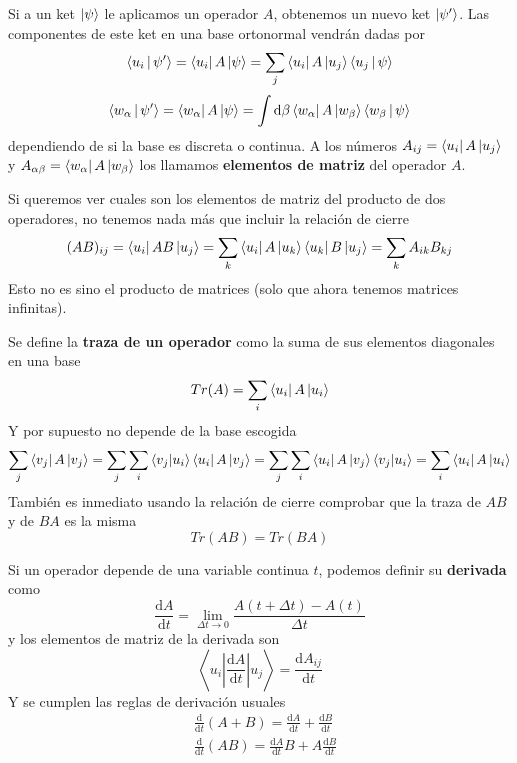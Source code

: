 \documentclass[12pt]{report}
\begin{document}
Si a un ket $\ket{\psi }$ le aplicamos un operador $A$, obtenemos un nuevo ket $\ket{\psi '}$. Las componentes de este ket en una base ortonormal vendrán dadas por
\begin{equation}
	\Braket{u_{i}|\psi '}=\bra{u_{i}}A\ket{\psi}=\sum_{j}\bra{u_{i}}A\ket{u_{j}}\Braket{u_{j}|\psi }
\end{equation}
\begin{equation}
	\Braket{w_{\alpha}|\psi '}=\bra{w_{\alpha}}A\ket{\psi}=\int\mathrm{d}\beta\bra{w_{\alpha}}A\ket{w_{\beta}}\Braket{w_{\beta}|\psi }
\end{equation}
dependiendo de si la base es discreta o continua. A los números $A_{ij}=\bra{u_{i}}A\ket{u_{j}}$ y $A_{\alpha\beta }=\bra{w_{\alpha }}A\ket{w_{\beta}}$ los llamamos \textbf{elementos de matriz} del operador $A$.

Si queremos ver cuales son los elementos de matriz del producto de dos operadores, no tenemos nada más que incluir la relación de cierre
\begin{equation}
	(AB)_{ij}=\bra{u_{i}}AB\ket{u_{j}}=\sum_{k}\bra{u_{i}}A\ket{u_{k}}\bra{u_{k}}B\ket{u_{j}}=\sum_{k}A_{ik}B_{kj}
\end{equation}
Esto no es sino el producto de matrices (solo que ahora tenemos matrices infinitas).

Se define la \textbf{traza de un operador} como la suma de sus elementos diagonales en una base
\begin{equation}
    Tr(A)=\sum_i\bra{u_i}A\ket{u_i}
\end{equation}
Y por supuesto no depende de la base escogida
\[ \sum_j\bra{v_j}A\ket{v_j}=\sum_j\sum_i\braket{v_j|u_i}\bra{u_i}A\ket{v_j}=\sum_j\sum_i\bra{u_i}A\ket{v_j}\braket{v_j|u_i}=\sum_i\bra{u_i}A\ket{u_i}\]
También es inmediato usando la relación de cierre comprobar que la traza de $AB$ y de $BA$ es la misma
\begin{equation}
    Tr(AB)=Tr(BA)
\end{equation}


Si un operador depende de una variable continua $t$, podemos definir su \textbf{derivada} como
\begin{equation}
    \frac{\mathrm{d}A}{\mathrm{d}t}=\lim_{\Delta t\to 0}\frac{A(t+\Delta t)-A(t)}{\Delta t}
\end{equation}
y los elementos de matriz de la derivada son
\begin{equation}
    \left< u_i\left|\frac{\mathrm{d}A}{\mathrm{d}t}\right| u_j\right> =\frac{\mathrm{d}A_{ij}}{\mathrm{d}t}
\end{equation}
Y se cumplen las reglas de derivación usuales
\begin{align}
    & \frac{\mathrm{d}}{\mathrm{d}t}(A+B)=\frac{\mathrm{d}A}{\mathrm{d}t}+\frac{\mathrm{d}B}{\mathrm{d}t}\\
    & \frac{\mathrm{d}}{\mathrm{d}t}(AB)=\frac{\mathrm{d}A}{\mathrm{d}t}B+A\frac{\mathrm{d}B}{\mathrm{d}t}
\end{align}
\end{document}
